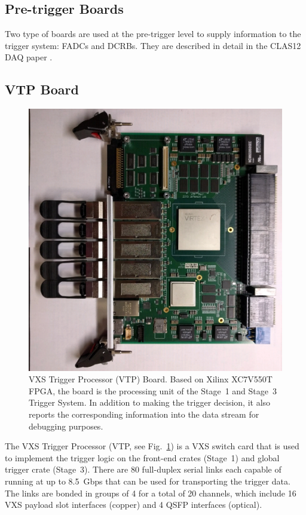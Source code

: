 \subsection{Pre-trigger Boards}

Two type of boards are used at the pre-trigger level to supply information to the trigger system: FADCs and
DCRBs. They are described in detail in the CLAS12 DAQ paper \cite{daq-ref}.

\subsection{VTP Board}
\label{sec:vtp_board}

\begin{figure}[hbt]
	\centering
	\includegraphics[width=1.0\columnwidth,keepaspectratio]{img/vtp_board.png}
	\caption{VXS Trigger Processor (VTP) Board. Based on Xilinx XC7V550T FPGA, the board is the processing
          unit of the Stage~1 and Stage~3 Trigger System. In addition to making the trigger decision, it also reports
          the corresponding information into the data stream for debugging purposes.}
	\label{fig:vtp_board}
\end{figure}

The VXS Trigger Processor (VTP, see Fig.~\ref{fig:vtp_board}) is a VXS switch card that is used to implement
the trigger logic on the front-end crates (Stage~1) and global trigger crate (Stage~3). There are 80 full-duplex
serial links each capable of running at up to 8.5~Gbps that can be used for transporting the trigger data. The
links are bonded in groups of 4 for a total of 20 channels, which include 16 VXS payload slot interfaces (copper)
and 4 QSFP interfaces (optical).

